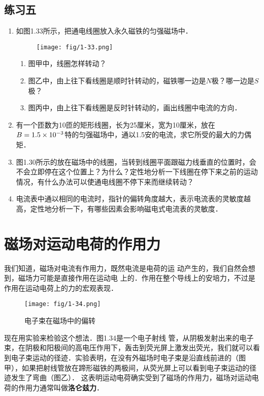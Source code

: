 \subsection*{练习五}
\begin{enumerate}
    \item 如图1.33所示，把通电线圈放入永久磁铁的匀强磁场中．
    \begin{figure}[htp]\centering
    	\texttt{[image: fig/1-33.png]}
    	\caption{ }
    \end{figure}
    \begin{enumerate}
        \item 图甲中，线圈怎样转动？
        \item 图乙中，由上往下看线圈是顺时针转动的，磁铁哪一边是$N$极？哪一边是$S$极？
        \item 图丙中，由上往下看线圈是反时针转动的，画出线圈中电流的方向．
    \end{enumerate}
    \item 有一个匝数为10匝的矩形线圈，长为25厘米，宽为10厘米，放在$B=1.5\times10^{-3}$特的匀强磁场中，通以1.5安的电流，求它所受的最大的力偶矩．
    \item 图1.30所示的放在磁场中的线圈，当转到线圈平面跟磁力线垂直的位置时，会不会立即停在这个位置上？为什么？定性地分析一下线圈在停下来之前的运动情况，有什么办法可以使通电线圈不停下来而继续转动？
    \item 电流表中通以相同的电流时，指针的偏转角度越大，表示电流表的灵敏度越高，定性地分析一下，有哪些因素会影响磁电式电流表的灵敏度．
\end{enumerate}


\section{磁场对运动电荷的作用力}
我们知道，磁场对电流有作用力，既然电流是电荷的运
动产生的，我们自然会想到，磁场力可能是直接作用在运动电
上的．作用在整个导线上的安培力，不过是作用在运动电荷上的力的宏观表现．
\begin{figure}[htp]\centering
	\texttt{[image: fig/1-34.png]}
	\caption{电子束在磁场中的偏转}
\end{figure}

现在用实验来检验这个想法．图1.34是一个电子射线
管，从阴极发射出来的电子束，在阴极和阳极间的高电压作用下，轰击到荧光屏上激发出荧光，我们就可以看到电子束运动的径迹．实验表明，在没有外磁场时电子束是沿直线前进的（图甲），如果把射线管放在蹄形磁铁的两极间，从荧光屏上可以看到电子束运动的径迹发生了弯曲（图乙）． 这表明运动电荷确实受到了磁场的作用力，磁场对运动电荷的作用力通常叫做\textbf{洛仑兹力}．

